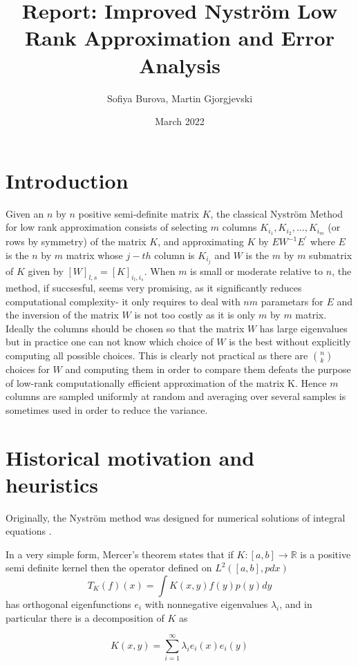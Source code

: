 \documentclass{article}
\title{Report: Improved Nyström Low Rank Approximation and Error Analysis \cite{10.1145/1390156.1390311}}
\author{Sofiya Burova, Martin Gjorgjevski}
\date{March 2022}
\begin{document}
\maketitle

\section{Introduction}
Given an $n$ by $n$ positive semi-definite matrix $K$, the classical Nyström Method for low rank approximation consists of
selecting $m$ columns $K_{i_1},K_{i_2},...,K_{i_m}$ (or rows by symmetry) of the matrix $K$, and approximating $K$ by $EW^{-1}E^{'}$ where $E$ is the $n$ by $m$ matrix whose $j-th$ column is $K_{i_j}$ and $W$ is the $m$ by $m$ submatrix of $K$ given by $[W]_{l,s}=[K]_{i_l,i_s}$.
When $m$ is small or moderate relative to $n$, the method, if succsesful, seems very promising, as it significantly reduces computational complexity- it only requires to deal with $nm$ parametars for $E$ and the inversion of the matrix $W$ is not too costly as it is only $m$ by $m$ matrix. Ideally the columns should be chosen so that the matrix $W$ has large eigenvalues
but in practice one can not know which choice of $W$ is the best without explicitly computing all possible choices. This is clearly not practical as there are $\binom{n}{k}$ choices for $W$ and computing them in order to compare them defeats the purpose of low-rank computationally efficient approximation of the matrix K. Hence  $m$  columns are sampled uniformly at random and averaging over several samples is sometimes used in order to reduce the variance.  

\section{Historical motivation and heuristics}

Originally, the Nyström method was designed for numerical solutions of integral equations \cite{Williams00theeffect}.

In a very simple form, Mercer's theorem  states that if $K:[a,b]\rightarrow \mathbb{R}$ is a positive semi definite kernel then the operator defined on $L^2([a,b],pdx)$
\begin{equation*}
    T_K(f)(x)=\int K(x,y)f(y)p(y)dy
\end{equation*}
has orthogonal eigenfunctions $e_i$ with nonnegative eigenvalues $\lambda_i$, and in particular there is a decomposition of $K$ as

\begin{equation*}
    K(x,y)=\sum_{i=1}^{\infty} \lambda_i e_i(x)e_i(y)
\end{equation*}
\end{document}
